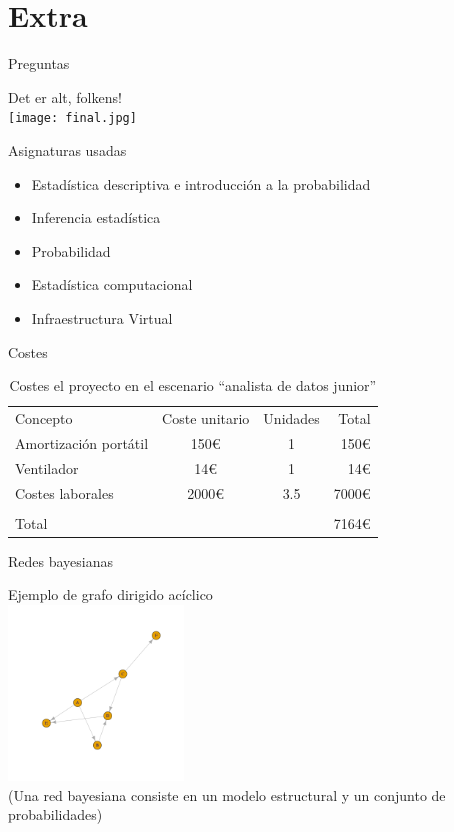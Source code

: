 \documentclass{beamer}
\begin{document}
\section{Extra}

\begin{frame}{Preguntas}
	\begin{center}
		Det er alt, folkens! \\[12pt]
		\texttt{[image: final.jpg]}
    \end{center}
\end{frame}

\begin{frame}{Asignaturas usadas}
	\begin{itemize}
		\item Estadística descriptiva e introducción a la probabilidad 
		\item Inferencia estadística 
		\item Probabilidad 
		\item Estadística computacional 
		\item Infraestructura Virtual
	\end{itemize}
\end{frame}

\begin{frame}{Costes}
	\begin{table}
		\begin{tabular}[h!tbp]{lccr}
		  Concepto & Coste unitario & Unidades & Total \\
		  Amortización portátil & 150€ & 1 & 150€ \\
		  Ventilador            & 14€  & 1 & 14€ \\
		  Costes laborales      & 2000€& 3.5 & 7000€ \\
		  \hline \\
		  \multicolumn{3}{l}{Total} & 7164€ \\
		\end{tabular}
		\caption{Costes el proyecto en el escenario ``analista de datos junior''} \label{tab:costes2}
		\end{table}
\end{frame}

\begin{frame}{Redes bayesianas}
	\begin{center}
		Ejemplo de grafo dirigido acíclico \\[12pt]
		\includegraphics[width=0.35\textwidth,keepaspectratio]{dag.png}
		\\
		\footnotesize(Una red bayesiana consiste en un modelo estructural y un conjunto de probabilidades)
    \end{center}
\end{frame}
\end{document}

